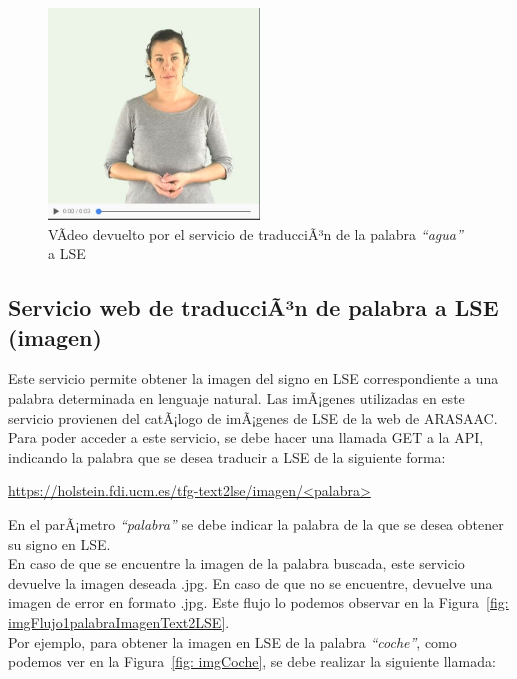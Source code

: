 \begin{figure}[]
	\centering
	\includegraphics[width=0.5\textwidth]{Imagenes/Fuentes/Text2LSE/videoEjemplo.jpg}
	\caption{VÃ­deo devuelto por el servicio de traducciÃ³n de la palabra \textit{``agua''} a LSE}
	\label {fig: videoAgua}
\end{figure}

\subsection{Servicio web de traducciÃ³n de palabra a LSE (imagen)}

Este servicio permite obtener la imagen del signo en LSE correspondiente a una palabra determinada en lenguaje natural. Las imÃ¡genes utilizadas en este servicio provienen del catÃ¡logo de imÃ¡genes de LSE de la web de ARASAAC. Para poder acceder a este servicio, se debe hacer una llamada GET a la API,  indicando la palabra que se desea traducir a LSE de la siguiente forma:\\

\begin{shaded}
	\url{https://holstein.fdi.ucm.es/tfg-text2lse/imagen/<palabra> }	
\end{shaded}

En el parÃ¡metro \textit{``palabra''} se debe indicar la palabra de la que se desea obtener su signo en LSE. \\

En caso de que se encuentre la imagen de la palabra buscada, este servicio devuelve la imagen deseada .jpg. En caso de que no se encuentre, devuelve una imagen de error en formato .jpg. Este flujo lo podemos observar en la Figura~\ref {fig: imgFlujo1palabraImagenText2LSE}. \\

Por ejemplo, para obtener la imagen en LSE de la palabra \textit{``coche''}, como podemos ver en la Figura~\ref {fig: imgCoche}, se debe realizar la siguiente llamada:

